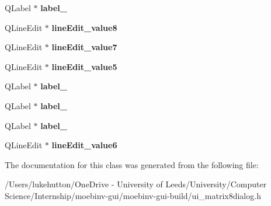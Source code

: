 \begin{DoxyCompactItemize}
Q\+Label $\ast$ {\bfseries label\+\_}
\item 
\mbox{\label{class_ui__matrix8dialog_aa1a34788df19af7cb4318cd55506013c}} 
Q\+Line\+Edit $\ast$ {\bfseries line\+Edit\+\_\+value8}
\item 
\mbox{\label{class_ui__matrix8dialog_ab0d3ddc7637b2d04609af1aba005d22b}} 
Q\+Line\+Edit $\ast$ {\bfseries line\+Edit\+\_\+value7}
\item 
\mbox{\label{class_ui__matrix8dialog_a6b9d474e8b60af43933806b4c2fb7055}} 
Q\+Line\+Edit $\ast$ {\bfseries line\+Edit\+\_\+value5}
\item 
\mbox{\label{class_ui__matrix8dialog_a3bde654266d91ad7ac339ddcda446cff}} 
Q\+Label $\ast$ {\bfseries label\+\_}
\item 
\mbox{\label{class_ui__matrix8dialog_a56e4ea75bd746b2aefc18a48512a6612}} 
Q\+Label $\ast$ {\bfseries label\+\_}
\item 
\mbox{\label{class_ui__matrix8dialog_ac6160d0d4e2382df77d0c61e168d271d}} 
Q\+Label $\ast$ {\bfseries label\+\_}
\item 
\mbox{\label{class_ui__matrix8dialog_af8ee00326ad344afc1fe571fcef389fd}} 
Q\+Line\+Edit $\ast$ {\bfseries line\+Edit\+\_\+value6}
\end{DoxyCompactItemize}


The documentation for this class was generated from the following file\+:\begin{DoxyCompactItemize}
\item 
/\+Users/lukehutton/\+One\+Drive -\/ University of Leeds/\+University/\+Computer Science/\+Internship/moebinv-\/gui/moebinv-\/gui-\/build/ui\+\_\+matrix8dialog.\+h\end{DoxyCompactItemize}
